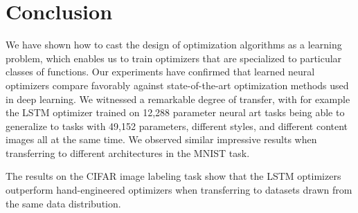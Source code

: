 \section{Conclusion}

We have shown how to cast the design of optimization algorithms as a learning
problem, which enables us to train optimizers that are specialized to
particular classes of functions.  Our experiments have confirmed that learned
neural optimizers compare favorably against state-of-the-art optimization
methods used in deep learning. We witnessed a remarkable degree of transfer,
with for example the LSTM optimizer trained on 12,288 parameter neural art
tasks being able to generalize to tasks with 49,152 parameters, different
styles, and different content images all at the same time. We observed similar
impressive results when transferring to different architectures in the MNIST
task.

The results on the CIFAR image labeling task show that the LSTM optimizers
outperform hand-engineered optimizers when transferring to datasets drawn from
the same data distribution.
 
